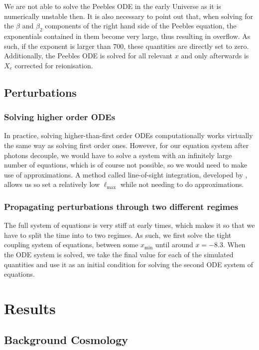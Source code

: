 \documentclass{aa}
\begin{document}
We are not able to solve the Peebles ODE in the early Universe as it is numerically unstable then. It is also necessary to point out that, when solving for the $\beta$ and $\beta_2$ components of the right hand side of the Peebles equation, the exponentials contained in them become very large, thus resulting in overflow. As such, if the exponent is larger than 700, these quantities are directly set to zero. Additionally, the Peebles ODE is solved for all relevant $x$ and only afterwards is $X_e$ corrected for reionisation.

\subsection{Perturbations}

\subsubsection{Solving higher order ODEs}

In practice, solving higher-than-first order ODEs computationally works virtually the same way as solving first order ones. However, for our equation system after photons decouple, we would have to solve a system with an infinitely large number of equations, which is of course not possible, so we would need to make use of approximations. A method called line-of-sight integration, developed by \citeauthor{1996ApJ...469..437S}, allows us so set a relatively low $\ell_{\textrm{max}}$ while not needing to do approximations.

\subsubsection{Propagating perturbations through two different regimes}

The full system of equations is very stiff at early times, which makes it so that we have to split the time into to two regimes. As such, we first solve the tight coupling system of equations, between some $x_\textrm{min}$ until around $x = -8.3$. When the ODE system is solved, we take the final value for each of the simulated quantities and use it as an initial condition for solving the second ODE system of equations.

\section{Results}

\subsection{Background Cosmology}
\end{document}
